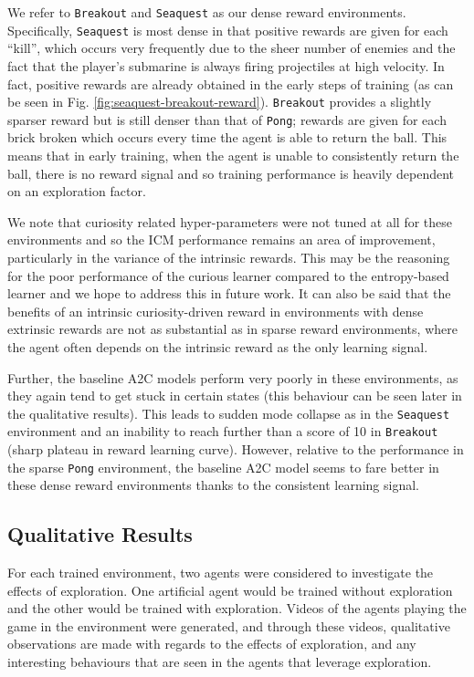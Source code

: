 \documentclass{article}
\begin{document}
We refer to \texttt{Breakout} and \texttt{Seaquest} as our dense reward environments. Specifically, \texttt{Seaquest} is most dense in that positive rewards are given for each ``kill'', which occurs very frequently due to the sheer number of enemies and the fact that the player's submarine is always firing projectiles at high velocity. In fact, positive rewards are already obtained in the early steps of training (as can be seen in Fig. \ref{fig:seaquest-breakout-reward}). \texttt{Breakout} provides a slightly sparser reward but is still denser than that of \texttt{Pong}; rewards are given for each brick broken which occurs every time the agent is able to return the ball. This means that in early training, when the agent is unable to consistently return the ball, there is no reward signal and so training performance is heavily dependent on an exploration factor.

We note that curiosity related hyper-parameters were not tuned at all for these environments and so the ICM performance remains an area of improvement, particularly in the variance of the intrinsic rewards. This may be the reasoning for the poor performance of the curious learner compared to the entropy-based learner and we hope to address this in future work. It can also be said that the benefits of an intrinsic curiosity-driven reward in environments with dense extrinsic rewards are not as substantial as in sparse reward environments, where the agent often depends on the intrinsic reward as the only learning signal.

Further, the baseline A2C models perform very poorly in these environments, as they again tend to get stuck in certain states (this behaviour can be seen later in the qualitative results). This leads to sudden mode collapse as in the \texttt{Seaquest} environment and an inability to reach further than a score of 10 in \texttt{Breakout} (sharp plateau in reward learning curve). However, relative to the performance in the sparse \texttt{Pong} environment, the baseline A2C model seems to fare better in these dense reward environments thanks to the consistent learning signal.

\subsection{Qualitative Results}
For each trained environment, two agents were considered to investigate the effects of exploration. One artificial agent would be trained without exploration and the other would be trained with exploration. Videos of the agents playing the game in the environment were generated, and through these videos, qualitative observations are made with regards to the effects of exploration, and any interesting behaviours that are seen in the agents that leverage exploration.
\end{document}

